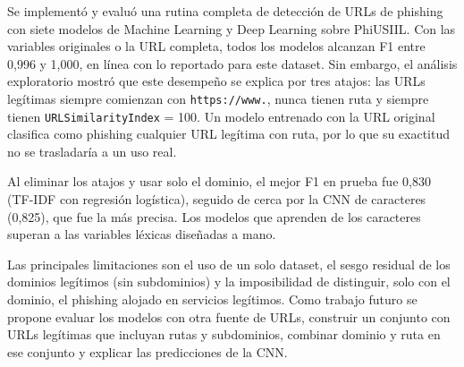 Se implementó y evaluó una rutina completa de detección de URLs de phishing con siete modelos de Machine Learning y Deep Learning sobre PhiUSIIL. Con las variables originales o la URL completa, todos los modelos alcanzan F1 entre 0,996 y 1,000, en línea con lo reportado para este dataset. Sin embargo, el análisis exploratorio mostró que este desempeño se explica por tres atajos: las URLs legítimas siempre comienzan con \texttt{https://www.}, nunca tienen ruta y siempre tienen \texttt{URLSimilarityIndex} = 100. Un modelo entrenado con la URL original clasifica como phishing cualquier URL legítima con ruta, por lo que su exactitud no se trasladaría a un uso real.

Al eliminar los atajos y usar solo el dominio, el mejor F1 en prueba fue 0,830 (TF-IDF con regresión logística), seguido de cerca por la CNN de caracteres (0,825), que fue la más precisa. Los modelos que aprenden de los caracteres superan a las variables léxicas diseñadas a mano.

Las principales limitaciones son el uso de un solo dataset, el sesgo residual de los dominios legítimos (sin subdominios) y la imposibilidad de distinguir, solo con el dominio, el phishing alojado en servicios legítimos. Como trabajo futuro se propone evaluar los modelos con otra fuente de URLs, construir un conjunto con URLs legítimas que incluyan rutas y subdominios, combinar dominio y ruta en ese conjunto y explicar las predicciones de la CNN.
